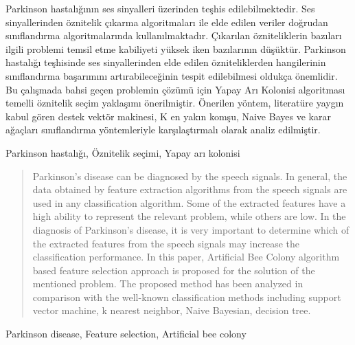 \documentclass[conference]{IEEEtran}
\begin{document}
\begin{ozet}
Parkinson hastalığının ses sinyalleri üzerinden teşhis edilebilmektedir. Ses sinyallerinden öznitelik çıkarma algoritmaları ile elde edilen veriler doğrudan sınıflandırma algoritmalarında kullanılmaktadır. Çıkarılan özniteliklerin bazıları ilgili problemi temsil etme kabiliyeti yüksek iken bazılarının düşüktür. Parkinson hastalığı teşhisinde ses sinyallerinden elde edilen özniteliklerden hangilerinin sınıflandırma başarımını artırabileceğinin tespit edilebilmesi oldukça önemlidir. Bu çalışmada bahsi geçen problemin çözümü için  Yapay Arı Kolonisi algoritması temelli öznitelik seçim yaklaşımı önerilmiştir. Önerilen yöntem, literatüre yaygın kabul gören destek vektör makinesi, K en yakın komşu, Naive Bayes ve karar ağaçları sınıflandırma yöntemleriyle karşılaştırmalı olarak analiz edilmiştir.
\end{ozet}
\begin{IEEEanahtar}
Parkinson hastalığı, Öznitelik seçimi, Yapay arı kolonisi
\end{IEEEanahtar}

\begin{abstract}
Parkinson's disease can be diagnosed by the speech signals. In general, the data obtained by feature extraction algorithms from the speech signals are used in any classification algorithm. Some of the extracted features have a high ability to represent the relevant problem, while others are low. In the diagnosis of Parkinson's disease, it is very important to determine which of the extracted features from the speech signals may increase the classification performance. In this paper, Artificial Bee Colony algorithm based feature selection approach is proposed for the solution of the mentioned problem. The proposed method has been analyzed in comparison with the well-known classification methods including support vector machine, k nearest neighbor, Naive Bayesian, decision tree.

\end{abstract}
\begin{IEEEkeywords}
Parkinson disease, Feature selection, Artificial bee colony
\end{IEEEkeywords}

\end{document}
